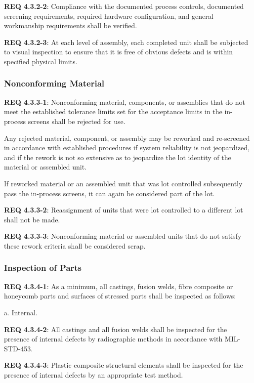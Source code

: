 \documentclass[12pt]{article}
\begin{document}
\noindent \textbf{REQ 4.3.2-2}: Compliance with the documented process controls, documented screening requirements, required hardware configuration, and general workmanship requirements shall be verified. 

\noindent \textbf{REQ 4.3.2-3}: At each level of assembly, each completed unit shall be subjected to visual inspection to ensure that it is free of obvious defects and is within specified physical limits.


\subsubsection{Nonconforming Material} %
\noindent \textbf{REQ 4.3.3-1}: Nonconforming material, components, or assemblies that do not meet the established tolerance limits set for the acceptance limits in the in-process screens shall be rejected for use. 

Any rejected material, component, or assembly may be reworked and re-screened in accordance with established procedures if system reliability is not jeopardized, and if the rework is not so extensive as to jeopardize the lot identity of the material or assembled unit.

If reworked material or an assembled unit that was lot controlled subsequently pass the in-process screens, it can again be considered part of the lot. 

\noindent \textbf{REQ 4.3.3-2}: Reassignment of units that were lot controlled to a different lot shall not be made.

\noindent \textbf{REQ 4.3.3-3}: Nonconforming material or assembled units that do not satisfy these rework criteria shall be considered scrap.


\subsubsection{Inspection of Parts} %
\noindent \textbf{REQ 4.3.4-1}: As a minimum, all castings, fusion welds, fibre composite or honeycomb parts and surfaces of stressed parts shall be inspected as follows:

a. Internal. 

\noindent \textbf{REQ 4.3.4-2}: All castings and all fusion welds shall be inspected for the presence of internal defects by radiographic methods in accordance with MIL-STD-453. 

\noindent \textbf{REQ 4.3.4-3}: Plastic composite structural elements shall be inspected for the presence of internal defects by an appropriate test method.
\end{document}
